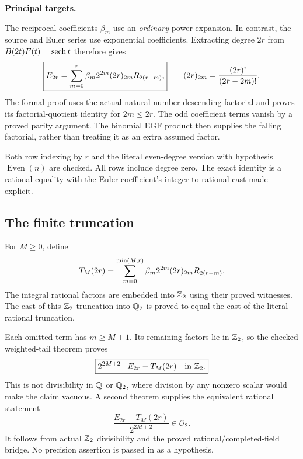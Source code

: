 \textbf{Principal targets.}\par
{}\par
{}\par
{}
\par\medskip
{}
The reciprocal coefficients $\beta_m$ use an \emph{ordinary} power expansion. In contrast, the source and Euler series use exponential coefficients. Extracting degree $2r$ from $B(2t)F(t)=\operatorname{sech} t$ therefore gives
\[
 \boxed{E_{2r}=\sum_{m=0}^{r}\beta_m2^{2m}(2r)_{2m}R_{2(r-m)},}
 \qquad
 (2r)_{2m}=\frac{(2r)!}{(2r-2m)!}.
\]
The formal proof uses the actual natural-number descending factorial and proves its factorial-quotient identity for $2m\leq2r$. The odd coefficient terms vanish by a proved parity argument. The binomial EGF product then supplies the falling factorial, rather than treating it as an extra assumed factor.

Both row indexing by $r$ and the literal even-degree version with hypothesis $\operatorname{Even}(n)$ are checked. All rows include degree zero. The exact identity is a rational equality with the Euler coefficient's integer-to-rational cast made explicit.

\subsection*{The finite truncation}
For $M\geq0$, define
\[
 T_M(2r)=\sum_{m=0}^{\min(M,r)}\beta_m2^{2m}(2r)_{2m}R_{2(r-m)}.
\]
The integral rational factors are embedded into $\mathbb Z_2$ using their proved witnesses. The cast of this $\mathbb Z_2$ truncation into $\mathbb Q_2$ is proved to equal the cast of the literal rational truncation.

Each omitted term has $m\geq M+1$. Its remaining factors lie in $\mathbb Z_2$, so the checked weighted-tail theorem proves
\[
 \boxed{2^{2M+2}\mid E_{2r}-T_M(2r)\quad\text{in }\mathbb Z_2.}
\]
This is not divisibility in $\mathbb Q$ or $\mathbb Q_2$, where division by any nonzero scalar would make the claim vacuous. A second theorem supplies the equivalent rational statement
\[
 \boxed{\frac{E_{2r}-T_M(2r)}{2^{2M+2}}\in\mathcal O_2.}
\]
It follows from actual $\mathbb Z_2$ divisibility and the proved rational/completed-field bridge. No precision assertion is passed in as a hypothesis.

